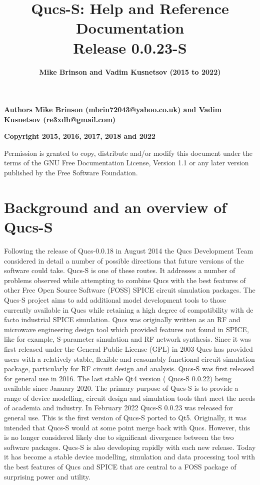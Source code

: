 \documentclass[10pt, a4paper]{report}
\title{\huge \textbf{Qucs-S: Help and Reference Documentation \\ Release 0.0.23-S } }
\author{ \LARGE \textbf {Mike Brinson and Vadim Kusnetsov (2015 to 2022)} }
\begin{document}
	
{\huge }
\maketitle

\begin{titlepage}
\noindent  \textbf{Authors Mike Brinson (mbrin72043@yahoo.co.uk) and Vadim Kusnetsov (re3xdh@gmail.com)}
\linebreak


\noindent  \textbf{Copyright 2015, 2016, 2017, 2018 and 2022}
\bigskip

\noindent Permission is granted to copy, distribute and/or modify this document under the terms of the GNU Free Documentation License,  Version  1.1  or any  later version published  by the Free Software  Foundation.		
\end{titlepage}

\tableofcontents
\newpage

\chapter{Background and an overview of Qucs-S}
Following the release of Qucs-0.0.18 in August 2014 the Qucs Development Team considered in detail a number of possible directions that future versions of the software could take. Qucs-S is one of these routes. It addresses a number of problems observed while attempting to combine Qucs with the best features of other Free Open Source Software (FOSS) SPICE circuit simulation packages. The Qucs-S project aims to add additional model development tools to those currently available in Qucs while retaining a high degree of compatibility with de facto industrial SPICE simulation. Qucs was originally written as an RF and microwave engineering design tool which provided features not found in SPICE, like for example, S-parameter simulation and RF network synthesis.  Since it was first released under the General Public License (GPL) in 2003 Qucs has provided users with a relatively stable, flexible and reasonably functional circuit simulation package, particularly for RF circuit design and analysis. Qucs-S was first released for general use in 2016. The last stable Qt4 version ( Qucs-S 0.0.22) being available since January 2020.  The primary purpose of Qucs-S is to provide a range of device modelling, circuit design and simulation tools that meet the needs of academia and industry. In February 2022 Qucs-S 0.0.23 was released for general use.  This is the first version of Qucs-S ported to Qt5.  Originally, it was intended that Qucs-S would at some point merge back with Qucs.  However, this is no longer considered likely due to significant divergence between the two software packages.  Qucs-S is also developing rapidly with each new release.  Today it has become a stable device modelling, simulation and data processing tool with the best features of Qucs and SPICE that are central to a FOSS package of surprising power and utility.  
\newline
\end{document}
